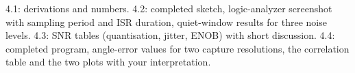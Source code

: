 \begin{deliverables}
4.1: derivations and numbers. 4.2: completed sketch, logic-analyzer screenshot
with sampling period and ISR duration, quiet-window results for three noise
levels. 4.3: SNR tables (quantisation, jitter, ENOB) with short discussion.
4.4: completed program, angle-error values for two capture resolutions, the
correlation table and the two plots with your interpretation.
\end{deliverables}
